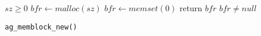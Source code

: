 \kant[1]

\begin{wrapfigure}{r}{.6\textwidth}
\begin{minipage}{0.6\textwidth}
\vspace{-1em}
\begin{algorithm}[H]
\small
\caption{\texttt{ag\_memblock\_new()}}
\label{alg:ag_memblock_new}
\begin{algorithmic}
\Require $sz \geq 0$
\State $bfr \gets malloc(sz)$
\State $bfr \gets memset(0)$
\State return $bfr$
\EndProcedure
\Ensure $bfr \neq null$
\end{algorithmic}
\end{algorithm}
\end{minipage}
\end{wrapfigure}

\kant[2]

